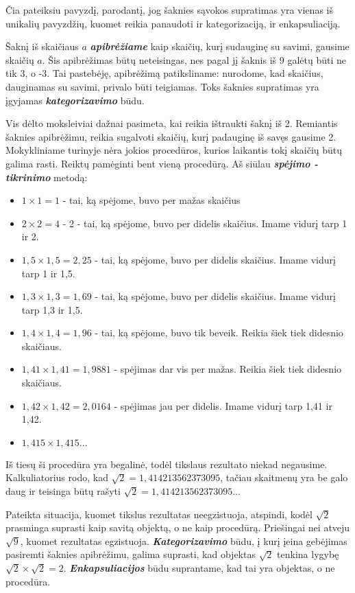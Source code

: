 \documentclass{article}
\begin{document}
Čia pateiksiu pavyzdį, parodantį, jog šaknies sąvokos supratimas yra vienas iš unikalių pavyzdžių, kuomet reikia panaudoti ir kategorizaciją, ir enkapsuliaciją.

Šaknį iš skaičiaus $a$ \textbf{\textit{apibrėžiame}} kaip skaičių, kurį sudauginę su savimi, gausime skaičių $a$. Šis apibrėžimas būtų neteisingas, nes pagal jį šaknis iš 9 galėtų būti ne tik 3, o -3. Tai pastebėję, apibrėžimą patiksliname: nurodome, kad skaičius, dauginamas su savimi, privalo būti teigiamas. Toks šaknies supratimas yra įgyjamas \textit{\textbf{kategorizavimo}} būdu. 

Vis dėlto moksleiviai dažnai pasimeta, kai reikia ištraukti šaknį iš 2. Remiantis šaknies apibrėžimu, reikia sugalvoti skaičių, kurį padauginę iš savęs gausime 2. Mokykliniame turinyje nėra jokios procedūros, kurios laikantis tokį skaičių būtų galima rasti. Reiktų pamėginti bent vieną procedūrą. Aš siūlau \textbf{\textit{spėjimo - tikrinimo}} metodą:

\begin{itemize}
\item $1\times 1=1$ - tai, ką spėjome, buvo per mažas skaičius
\item $2\times 2=4$ - 2 - tai, ką spėjome, buvo per didelis skaičius. Imame vidurį tarp 1 ir 2.
\item $1,5\times 1,5=2,25$ - tai, ką spėjome, buvo per didelis skaičius. Imame vidurį tarp 1 ir 1,5.
\item $1,3\times 1,3=1,69$ - tai, ką spėjome, buvo per didelis skaičius. Imame vidurį tarp 1,3 ir 1,5.
\item $1,4\times 1,4=1,96$ - tai, ką spėjome, buvo tik beveik. Reikia šiek tiek didesnio skaičiaus.
\item $1,41\times 1,41=1,9881$ - spėjimas dar vis per mažas. Reikia šiek tiek didesnio skaičiaus.
\item $1,42\times 1,42=2,0164$ - spėjimas jau per didelis. Imame vidurį tarp 1,41 ir 1,42.
\item $1,415\times 1,415\dots$
\end{itemize}
 
Iš tiesų ši procedūra yra begalinė, todėl tikslaus rezultato niekad negausime. Kalkuliatorius rodo, kad $\sqrt{2}=1,414213562373095$, tačiau skaitmenų yra be galo daug ir teisinga būtų rašyti $\sqrt{2}=1,414213562373095\dots$
 
Pateikta situacija, kuomet tikslus rezultatas neegzistuoja, atspindi, kodėl $\sqrt{2}$ prasminga suprasti kaip savitą objektą, o ne kaip procedūrą. Priešingai nei atveju $\sqrt{9}$, kuomet rezultatas egzistuoja. \textit{\textbf{Kategorizavimo}} būdu, į kurį įeina gebėjimas pasiremti šaknies apibrėžimu, galima suprasti, kad objektas $\sqrt{2}$ tenkina lygybę $\sqrt{2}\times \sqrt{2}=2$. \textbf{\textit{Enkapsuliacijos}} būdu suprantame, kad tai yra objektas, o ne procedūra.
\end{document}
